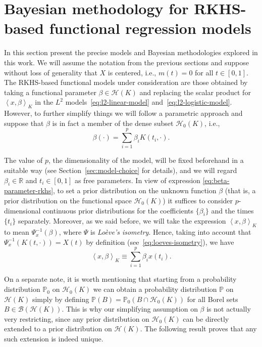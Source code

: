 \documentclass[ba]{imsart}
\numberwithin{equation}{section}
\theoremstyle{plain}
\newcommand{\R}{\mathbb{R}}
\newcommand\dotprod[2]{\left\langle #1, #2 \right\rangle}
\begin{document}
\section{Bayesian methodology for RKHS-based functional regression models}\label{sec:methodology}

In this section present the precise models and Bayesian methodologies explored in this work. We will assume the notation from the previous sections and suppose without loss of generality that \(X\) is centered, i.e., \(m(t)=0\) for all \(t\in[0, 1]\). The RKHS-based functional models under consideration are those obtained by taking a functional parameter \(\beta \in \mathcal H(K)\) and replacing the scalar product for \(\dotprod{x}{\beta}_K\) in the \(L^2\) models~\eqref{eq:l2-linear-model} and~\eqref{eq:l2-logistic-model}. However, to further simplify things we will follow a parametric approach and suppose that \(\beta\) is in fact a member of the dense subset \(\mathcal H_0(K)\), i.e.,
\begin{equation}\label{eq:beta-parameter-rkhs}
  \beta(\cdot) = \sum_{i=1}^p \beta_i K(t_i, \cdot).
\end{equation}

The value of \(p\), the dimensionality of the model, will be fixed beforehand in a suitable way (see Section~\ref{sec:model-choice} for details), and we will regard \(\beta_i \in \R\) and \(t_i \in [0, 1]\) as free parameters. In view of expression \eqref{eq:beta-parameter-rkhs}, to set a prior distribution on the unknown function \(\beta\) (that is, a prior distribution on the functional space \(\mathcal H_0(K)\)) it suffices to consider \(p\)-dimensional continuous prior distributions for the coefficients \(\{\beta_i\}\) and the times \(\{t_i\}\) separately. Moreover, as we said before, we will take the expression \(\dotprod{x}{\beta}_K\) to mean \(\Psi_x^{-1}(\beta)\), where \(\Psi\) is \textit{Loève's isometry}. Hence, taking into account that \(\Psi_x^{-1}(K(t, \cdot)) = X(t)\) by definition (see~\eqref{eq:loeves-isometry}), we have
\[
\dotprod{x}{\beta}_K \equiv \sum_{i=1}^p \beta_i x(t_i).
\]

On a separate note, it is worth mentioning that starting from a probability distribution \(\mathbb{P}_0\) on \(\mathcal H_0(K)\) we can obtain a probability distribution \(\mathbb{P}\) on \(\mathcal H(K)\) simply by defining \(\mathbb{P}(B) = \mathbb{P}_0(B\cap \mathcal H_0(K))\) for all Borel sets \(B \in \mathcal B(\mathcal H(K))\). This is why our simplifying assumption on \(\beta\) is not actually very restricting, since any prior distribution on \(\mathcal H_0(K)\) can be directly extended to a prior distribution on \(\mathcal H(K)\). The following result proves that any such extension is indeed unique.
\end{document}
